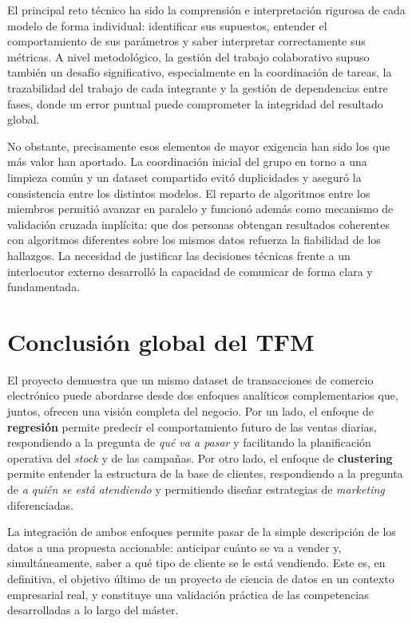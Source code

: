 \documentclass[11pt,a4paper]{article}
\begin{document}
El principal reto técnico ha sido la comprensión e interpretación rigurosa de cada modelo de forma individual: identificar sus supuestos, entender el comportamiento de sus parámetros y saber interpretar correctamente sus métricas. A nivel metodológico, la gestión del trabajo colaborativo supuso también un desafío significativo, especialmente en la coordinación de tareas, la trazabilidad del trabajo de cada integrante y la gestión de dependencias entre fases, donde un error puntual puede comprometer la integridad del resultado global.

No obstante, precisamente esos elementos de mayor exigencia han sido los que más valor han aportado. La coordinación inicial del grupo en torno a una limpieza común y un dataset compartido evitó duplicidades y aseguró la consistencia entre los distintos modelos. El reparto de algoritmos entre los miembros permitió avanzar en paralelo y funcionó además como mecanismo de validación cruzada implícita: que dos personas obtengan resultados coherentes con algoritmos diferentes sobre los mismos datos refuerza la fiabilidad de los hallazgos. La necesidad de justificar las decisiones técnicas frente a un interlocutor externo desarrolló la capacidad de comunicar de forma clara y fundamentada.

\section{Conclusión global del TFM}

El proyecto demuestra que un mismo dataset de transacciones de comercio electrónico puede abordarse desde dos enfoques analíticos complementarios que, juntos, ofrecen una visión completa del negocio. Por un lado, el enfoque de \textbf{regresión} permite predecir el comportamiento futuro de las ventas diarias, respondiendo a la pregunta de \textit{qué va a pasar} y facilitando la planificación operativa del \textit{stock} y de las campañas. Por otro lado, el enfoque de \textbf{clustering} permite entender la estructura de la base de clientes, respondiendo a la pregunta de \textit{a quién se está atendiendo} y permitiendo diseñar estrategias de \textit{marketing} diferenciadas.

La integración de ambos enfoques permite pasar de la simple descripción de los datos a una propuesta accionable: anticipar cuánto se va a vender y, simultáneamente, saber a qué tipo de cliente se le está vendiendo. Este es, en definitiva, el objetivo último de un proyecto de ciencia de datos en un contexto empresarial real, y constituye una validación práctica de las competencias desarrolladas a lo largo del máster.
\end{document}
